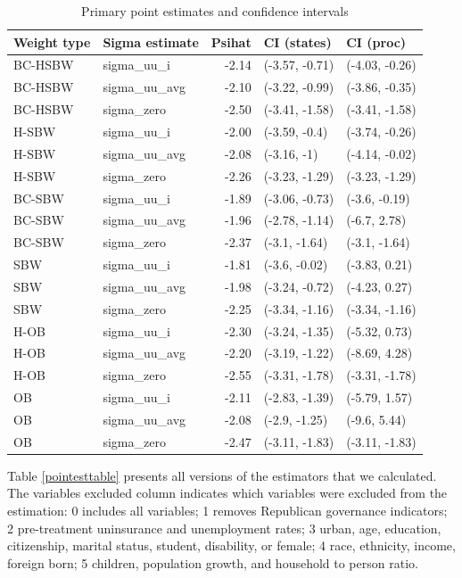 \documentclass[12pt]{article}
\begin{document}
\begin{table}[ht]
\begin{tabular}{llrll}
  \toprule
Weight type & Sigma estimate & Psihat & CI (states) & CI (proc) \\ 
  \midrule
BC-HSBW & sigma\_uu\_i & -2.14 & (-3.57, -0.71) & (-4.03, -0.26) \\ 
  BC-HSBW & sigma\_uu\_avg & -2.10 & (-3.22, -0.99) & (-3.86, -0.35) \\ 
  BC-HSBW & sigma\_zero & -2.50 & (-3.41, -1.58) & (-3.41, -1.58) \\ 
  H-SBW & sigma\_uu\_i & -2.00 & (-3.59, -0.4) & (-3.74, -0.26) \\ 
  H-SBW & sigma\_uu\_avg & -2.08 & (-3.16, -1) & (-4.14, -0.02) \\ 
  H-SBW & sigma\_zero & -2.26 & (-3.23, -1.29) & (-3.23, -1.29) \\ 
  BC-SBW & sigma\_uu\_i & -1.89 & (-3.06, -0.73) & (-3.6, -0.19) \\ 
  BC-SBW & sigma\_uu\_avg & -1.96 & (-2.78, -1.14) & (-6.7, 2.78) \\ 
  BC-SBW & sigma\_zero & -2.37 & (-3.1, -1.64) & (-3.1, -1.64) \\ 
  SBW & sigma\_uu\_i & -1.81 & (-3.6, -0.02) & (-3.83, 0.21) \\ 
  SBW & sigma\_uu\_avg & -1.98 & (-3.24, -0.72) & (-4.23, 0.27) \\ 
  SBW & sigma\_zero & -2.25 & (-3.34, -1.16) & (-3.34, -1.16) \\ 
  H-OB & sigma\_uu\_i & -2.30 & (-3.24, -1.35) & (-5.32, 0.73) \\ 
  H-OB & sigma\_uu\_avg & -2.20 & (-3.19, -1.22) & (-8.69, 4.28) \\ 
  H-OB & sigma\_zero & -2.55 & (-3.31, -1.78) & (-3.31, -1.78) \\ 
  OB & sigma\_uu\_i & -2.11 & (-2.83, -1.39) & (-5.79, 1.57) \\ 
  OB & sigma\_uu\_avg & -2.08 & (-2.9, -1.25) & (-9.6, 5.44) \\ 
  OB & sigma\_zero & -2.47 & (-3.11, -1.83) & (-3.11, -1.83) \\ 
   \bottomrule
\end{tabular}
\caption{Primary point estimates and confidence intervals}
\label{maintable1}
\end{table}

Table \ref{pointesttable} presents all versions of the estimators that we calculated. The variables excluded column indicates which variables were excluded from the estimation: 0 includes all variables; 1 removes Republican governance indicators; 2 pre-treatment uninsurance and unemployment rates; 3 urban, age, education, citizenship, marital status, student, disability, or female; 4 race, ethnicity, income, foreign born; 5 children, population growth, and household to person ratio.
\end{document}
